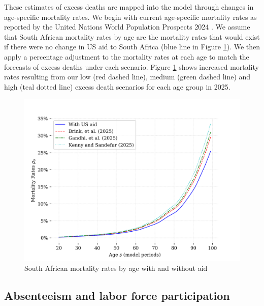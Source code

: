 \documentclass[letterpaper,12pt]{article}
\theoremstyle{definition}
\begin{document}
\begin{spacing}{1.5}
These estimates of excess deaths are mapped into the model through changes in age-specific mortality rates. We begin with current age-specific mortality rates as reported by the United Nations World Population Prospects 2024 \citep{UN2024}. We assume that South African mortality rates by age are the mortality rates that would exist if there were no change in US aid to South Africa (blue line in Figure \ref{fig:Mortality}). We then apply a percentage adjustment to the mortality rates at each age to match the forecasts of excess deaths under each scenario. Figure \ref{fig:Mortality} shows increased mortality rates resulting from our low (red dashed line), medium (green dashed line) and high (teal dotted line) excess death scenarios for each age group in 2025.


\begin{figure}[H]
    \caption{South African mortality rates by age with and without aid}
    \label{fig:Mortality}
    \centering
    \includegraphics[scale=0.75]{./tables_figures/mortality_rates.png}
\end{figure}





\subsection{Absenteeism and labor force participation}


\end{spacing}
\end{document}
